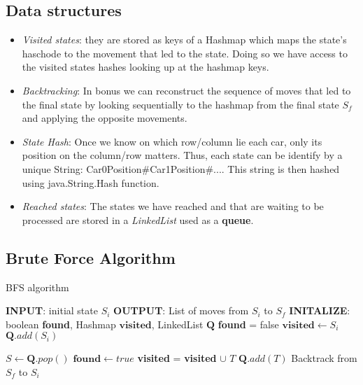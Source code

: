 \documentclass[10pt,a4paper]{article}
\begin{document}
\subsection{Data structures}
\begin{itemize}
\item  \textit{Visited states}: they are stored as keys of a Hashmap which maps the state's haschode to the movement that led to the state. Doing so we have access to the visited states hashes looking up at the hashmap keys.\\
\item \textit{Backtracking}: In bonus we can reconstruct the sequence of moves that led to the final state by looking sequentially to the hashmap from the final state $S_f$ and applying the opposite movements.\\
\item \textit{State Hash}: Once we know on which row/column lie each car, only its position on the column/row matters. Thus, each state can be identify by a unique String: Car0Position\#Car1Position\#.... This string is then hashed using java.String.Hash function.\\

\item \textit{Reached states}: The states we have reached and that are waiting to be processed are stored in a \textit{LinkedList} used as a \textbf{queue}.\\

\end{itemize}




\subsection{Brute Force Algorithm}

\begin{algorithm}[H]
\caption{BFS algorithm}
\begin{algorithmic}
\STATE \textbf{INPUT}: initial state $S_i$
\STATE \textbf{OUTPUT}: List of moves from $S_i$ to $S_f$
\STATE
\STATE \textbf{INITALIZE}:
\STATE boolean \textbf{found}, Hashmap $\textbf{visited}$, LinkedList  $\textbf{Q}$
\STATE \textbf{found} = false
\STATE $\textbf{visited} \leftarrow S_i$
\STATE $\textbf{Q}.add(S_i)$
\STATE

\STATE $\textit{S} \leftarrow \textbf{Q}.pop()$
\STATE $\textbf{found}\leftarrow true$
\ENDIF
\STATE \textbf{visited} = \textbf{visited }$\cup$\textit{ $T$}
\STATE $\textbf{Q}.add(T)$
\ENDIF
\ENDFOR
\ENDWHILE 
\STATE
\STATE Backtrack from $S_f$ to $S_i$
\end{algorithmic}
\end{algorithm}
\end{document}

